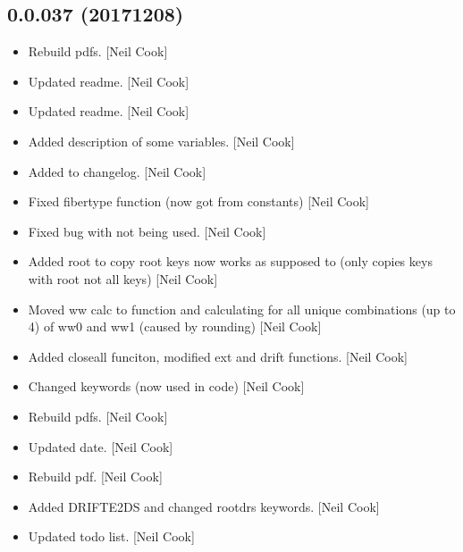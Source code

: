 \documentclass[a4paper,10pt,english]{report}
\begin{document}
\subsection{0.0.037 (2017\sphinxhyphen{}12\sphinxhyphen{}08)}
\label{\detokenize{misc/changelog:id533}}\begin{itemize}
\item {} 
Rebuild pdfs. {[}Neil Cook{]}

\item {} 
Updated readme. {[}Neil Cook{]}

\item {} 
Updated readme. {[}Neil Cook{]}

\item {} 
Added description of some variables. {[}Neil Cook{]}

\item {} 
Added to changelog. {[}Neil Cook{]}

\item {} 
Fixed fibertype function (now got from constants) {[}Neil Cook{]}

\item {} 
Fixed bug with  not being used. {[}Neil Cook{]}

\item {} 
Added root to copy root keys \sphinxhyphen{} now works as supposed to (only copies
keys with root not all keys) {[}Neil Cook{]}

\item {} 
Moved ww calc to function and calculating for all unique combinations
(up to 4) of ww0 and ww1 (caused by rounding) {[}Neil Cook{]}

\item {} 
Added closeall funciton, modified ext and drift functions. {[}Neil Cook{]}

\item {} 
Changed  keywords (now used in code) {[}Neil Cook{]}

\item {} 
Rebuild pdfs. {[}Neil Cook{]}

\item {} 
Updated date. {[}Neil Cook{]}

\item {} 
Rebuild pdf. {[}Neil Cook{]}

\item {} 
Added DRIFT\sphinxhyphen{}E2DS and changed rootdrs keywords. {[}Neil Cook{]}

\item {} 
Updated todo list. {[}Neil Cook{]}


\end{itemize}
\end{document}

